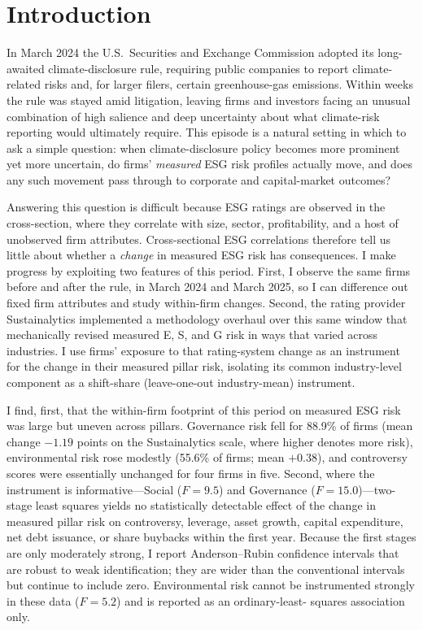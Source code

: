 \documentclass[12pt]{article}
\begin{document}
\section{Introduction}
In March 2024 the U.S.\ Securities and Exchange Commission adopted its long-awaited
climate-disclosure rule, requiring public companies to report climate-related risks and, for
larger filers, certain greenhouse-gas emissions. Within weeks the rule was stayed amid
litigation, leaving firms and investors facing an unusual combination of high salience and deep
uncertainty about what climate-risk reporting would ultimately require. This episode is a
natural setting in which to ask a simple question: when climate-disclosure policy becomes more
prominent yet more uncertain, do firms' \emph{measured} ESG risk profiles actually move, and
does any such movement pass through to corporate and capital-market outcomes?

Answering this question is difficult because ESG ratings are observed in the cross-section, where
they correlate with size, sector, profitability, and a host of unobserved firm attributes.
Cross-sectional ESG correlations therefore tell us little about whether a \emph{change} in
measured ESG risk has consequences. I make progress by exploiting two features of this period.
First, I observe the same firms before and after the rule, in March 2024 and March 2025, so I
can difference out fixed firm attributes and study within-firm changes. Second, the rating
provider Sustainalytics implemented a methodology overhaul over this same window that mechanically
revised measured E, S, and G risk in ways that varied across industries. I use firms' exposure to
that rating-system change as an instrument for the change in their measured pillar risk, isolating
its common industry-level component as a shift-share (leave-one-out industry-mean) instrument.

I find, first, that the within-firm footprint of this period on measured ESG risk was large but
uneven across pillars. Governance risk fell for 88.9\% of firms (mean change $-1.19$ points on
the Sustainalytics scale, where higher denotes more risk), environmental risk rose modestly
(55.6\% of firms; mean $+0.38$), and controversy scores were essentially unchanged for four firms
in five. Second, where the instrument is informative---Social ($F = 9.5$) and Governance
($F = 15.0$)---two-stage least squares yields no statistically detectable effect of the change in
measured pillar risk on controversy, leverage, asset growth, capital expenditure, net debt
issuance, or share buybacks within the first year. Because the first stages are only moderately
strong, I report Anderson--Rubin confidence intervals that are robust to weak identification;
they are wider than the conventional intervals but continue to include zero. Environmental risk
cannot be instrumented strongly in these data ($F = 5.2$) and is reported as an ordinary-least-
squares association only.
\end{document}

